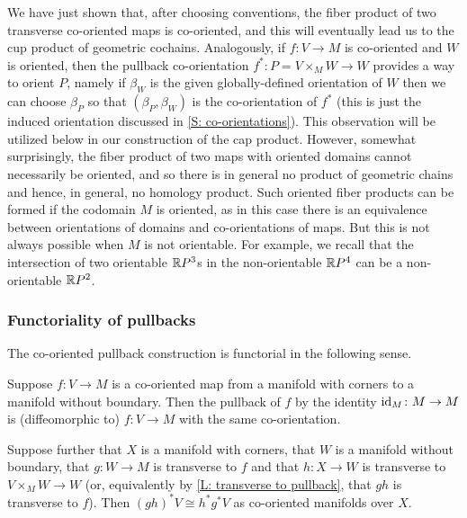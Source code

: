 \begin{remark}\label{R: what products exist}
	We have just shown that, after choosing conventions, the fiber product of two transverse co-oriented maps is co-oriented, and this will eventually lead us to the cup product of geometric cochains.
	Analogously, if $f \colon V \to M$ is co-oriented and $W$ is oriented, then the pullback co-orientation $f^* \colon P = V \times_M W \to W$ provides a way to orient $P$, namely if $\beta_W$ is the given globally-defined orientation of $W$ then we can choose $\beta_P$ so that $(\beta_P, \beta_W)$ is the co-orientation of $f^*$ (this is just the induced orientation discussed in \cref{S: co-orientations}).
	This observation will be utilized below in our construction of the cap product.
	However, somewhat surprisingly, the fiber product of two maps with oriented domains cannot necessarily be oriented, and so there is in general no product of geometric chains and hence, in general, no homology product.
	Such oriented fiber products can be formed if the codomain $M$ is oriented, as in this case there is an equivalence between orientations of domains and co-orientations of maps.
	But this is not always possible when $M$ is not orientable.
	For example, we recall that the intersection of two orientable $\mathbb{R} P^3$s in the non-orientable $\mathbb{R} P^4$ can be a non-orientable $\mathbb{R} P^2$.
\end{remark}

\subsubsection{Functoriality of pullbacks}

The co-oriented pullback construction is functorial in the following sense.

\begin{proposition}\label{P: pullback functoriality}
	Suppose $f \colon V \to M$ is a co-oriented map from a manifold with corners to a manifold without boundary.
	Then the pullback of $f$ by the identity $\mathrm{id}_M \colon M \to M$ is (diffeomorphic to) $f \colon V \to M$ with the same co-orientation.

	Suppose further that $X$ is a manifold with corners, that $W$ is a manifold without boundary, that $g \colon W \to M$ is transverse to $f$ and that $h \colon X \to W$ is transverse to $V \times_M W \to W$ (or, equivalently by \cref{L: transverse to pullback}, that $gh$ is transverse to $f$).
	Then $(gh)^*V \cong h^*g^*V$ as co-oriented manifolds over $X$.
\end{proposition}

